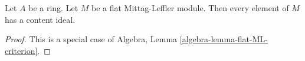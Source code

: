 \begin{lemma}
\label{lemma-content-exists-flat-Mittag-Leffler}
Let $A$ be a ring. Let $M$ be a flat Mittag-Leffler module.
Then every element of $M$ has a content ideal.
\end{lemma}

\begin{proof}
This is a special case of Algebra, Lemma \ref{algebra-lemma-flat-ML-criterion}.
\end{proof}

